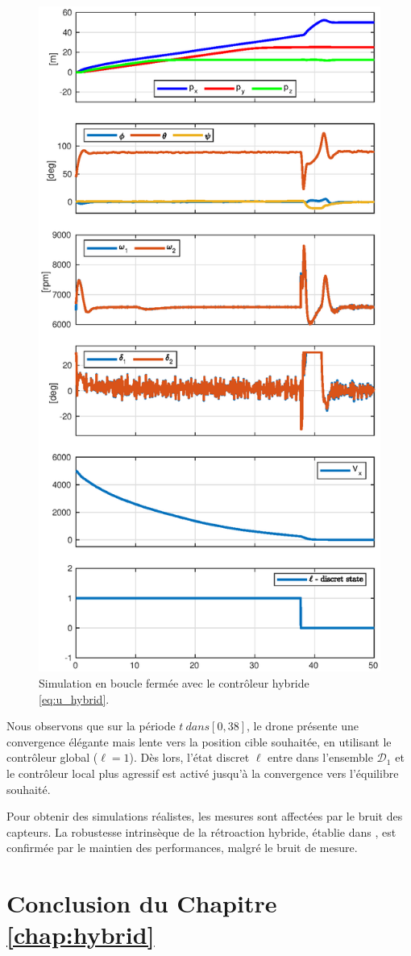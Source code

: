 \begin{figure}[!ht]
    \centering
    \includegraphics[trim=0cm 0cm 0cm 1.1cm,clip,width=0.8\columnwidth]{figures/switch_paper2.eps}
    \caption{Simulation en boucle fermée avec le contrôleur hybride \eqref{eq:u_hybrid}.}
    \label{fig_sim}
\end{figure}

Nous observons que sur la période $t \ dans \left[0,38\right]$, le drone
présente une convergence élégante mais lente vers la position cible souhaitée, en utilisant le contrôleur global ($\ell=1$). Dès lors, l'état discret $\ell$ entre dans l'ensemble $\mathcal{D}_1$ et le contrôleur local plus agressif est activé jusqu'à la convergence vers l'équilibre souhaité.

Pour obtenir des simulations réalistes, les mesures sont affectées par 
le bruit des capteurs. La robustesse intrinsèque de la rétroaction hybride, établie dans \cite[Chapitre 7]{65}, est confirmée par le maintien des performances, malgré le bruit de mesure.

\section{Conclusion du Chapitre \ref{chap:hybrid}}





